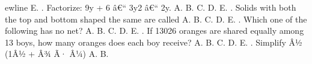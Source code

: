 \documentclass{article}
\begin{document}
\begin{multicols}{2}
ewline \indent E.  \newline{}. Factorize: 9y + 6 â€“ 3y2 â€“ 2y. \newline \indent A. \newline \indent B. \newline \indent C. \newline \indent D. \newline \indent E.  \newline{}. Solids with both the top and bottom shaped the same are called \newline \indent A. \newline \indent B. \newline \indent C. \newline \indent D. \newline \indent E.  \newline{}. Which one of the following has no net? \newline \indent A. \newline \indent B. \newline \indent C. \newline \indent D. \newline \indent E.  \newline{}. If 13026 oranges are shared equally among 13 boys, how many oranges does each boy receive? \newline \indent A. \newline \indent B. \newline \indent C. \newline \indent D. \newline \indent E.  \newline{}. Simplify Â½ (1Â½ + Â¾ Ã· Â¼) \newline \indent A. \newline \indent B. \newli
\end{multicols}
\end{document}
